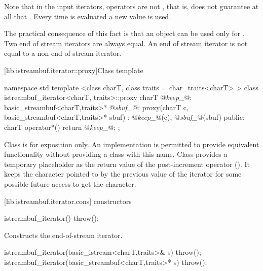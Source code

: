 \pnum
Note that in the input iterators, \tcode{++} operators are not
, that is,  does not guarantee
at all that . Every time \tcode{++} is evaluated a new
value is used.

\pnum
The practical consequence of this fact is that an 
object can be used only for . Two end of stream
iterators are always equal. An end of stream iterator is not equal
to a non-end of stream iterator.

[lib.istreambuf.iterator::proxy]{Class template }

%
\begin{codeblock}
namespace std {
  template <class charT, class traits = char_traits<charT> >
  class istreambuf_iterator<charT, traits>::proxy {
    charT @\textit{keep_}@;
    basic_streambuf<charT,traits>* @\textit{sbuf_}@;
    proxy(charT c,
          basic_streambuf<charT,traits>* sbuf)
      : @\textit{keep_}@(c), @\textit{sbuf_}@(sbuf) {}
  public:
    charT operator*() { return @\textit{keep_}@; }
  };
}
\end{codeblock}

\pnum
Class
is for exposition only.
An implementation is permitted to provide equivalent functionality without
providing a class with this name.
Class
provides a temporary
placeholder as the return value of the post-increment operator
().
It keeps the character pointed to by the previous value
of the iterator for some possible future access to get the character.

[lib.istreambuf.iterator.cons]{ constructors}


%
\begin{itemdecl}
istreambuf_iterator() throw();
\end{itemdecl}

\begin{itemdescr}
\pnum
\effects
Constructs the end-of-stream iterator.
\end{itemdescr}


%
\begin{itemdecl}
istreambuf_iterator(basic_istream<charT,traits>& s) throw();
istreambuf_iterator(basic_streambuf<charT,traits>* s) throw();
\end{itemdecl}

